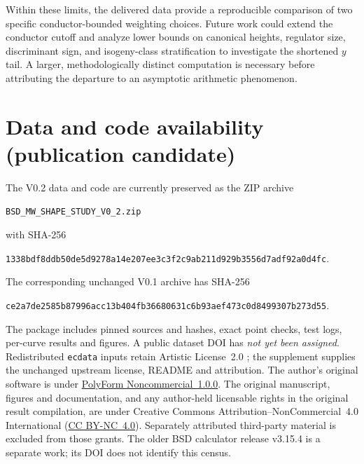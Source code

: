 \documentclass[11pt,a4paper]{article}
\begin{document}
Within these limits, the delivered data provide a reproducible comparison of two specific conductor-bounded weighting choices. Future work could extend the conductor cutoff and analyze lower bounds on canonical heights, regulator size, discriminant sign, and isogeny-class stratification to investigate the shortened $y$ tail. A larger, methodologically distinct computation is necessary before attributing the departure to an asymptotic arithmetic phenomenon.

\section*{Data and code availability (publication candidate)}
The V0.2 data and code are currently preserved as the ZIP archive\begin{center}\footnotesize\texttt{BSD\_MW\_SHAPE\_STUDY\_V0\_2.zip}\end{center}with SHA-256
\begin{center}\footnotesize\texttt{1338bdf8ddb50de5d9278a14e207ee3c3f2c9ab211d929b3556d7adf92a0d4fc}.\end{center}
The corresponding unchanged V0.1 archive has SHA-256
\begin{center}\footnotesize\texttt{ce2a7de2585b87996acc13b404fb36680631c6b93aef473c0d8499307b273d55}.\end{center}
The package includes pinned sources and hashes, exact point checks, test logs, per-curve results and figures. A public dataset DOI has \emph{not yet been assigned}. Redistributed \texttt{ecdata} inputs retain Artistic License~2.0 \cite{CremonaData}; the supplement supplies the unchanged upstream license, README and attribution. The author's original software is under \href{https://polyformproject.org/licenses/noncommercial/1.0.0}{PolyForm Noncommercial~1.0.0}. The original manuscript, figures and documentation, and any author-held licensable rights in the original result compilation, are under Creative Commons Attribution--NonCommercial~4.0 International (\href{https://creativecommons.org/licenses/by-nc/4.0/}{CC BY-NC~4.0}). Separately attributed third-party material is excluded from those grants. The older BSD calculator release v3.15.4 is a separate work; its DOI does not identify this census.
\end{document}
